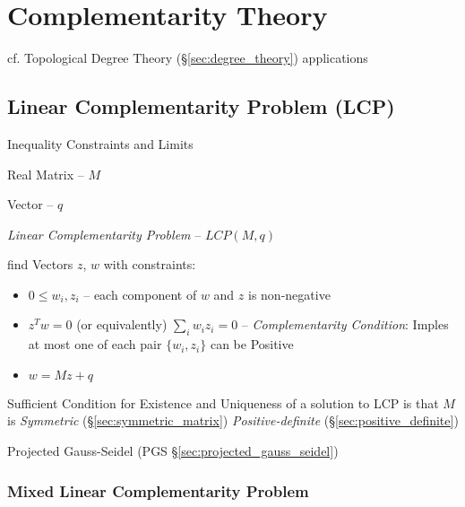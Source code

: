 \section{Complementarity Theory}\label{sec:complementarity_theory}

cf. Topological Degree Theory (\S\ref{sec:degree_theory}) applications



\subsection{Linear Complementarity Problem (LCP)}
\label{sec:linear_complementarity}


Inequality Constraints and Limits %

Real Matrix -- $M$

Vector -- $q$

\emph{Linear Complementarity Problem} -- $LCP(M,q)$

find Vectors $z$, $w$ with constraints:

\begin{itemize}
  \item $0 \leq w_i,z_i$ -- each component of $w$ and $z$ is
    non-negative
  \item $z^T w = 0$ (or equivalently) $\sum_i w_i z_i = 0$ --
    \emph{Complementarity Condition}: Imples at most one of each pair
    $\{w_i,z_i\}$ can be Positive
  \item $w = M z + q$
\end{itemize}

Sufficient Condition for Existence and Uniqueness of a solution to LCP
is that $M$ is \emph{Symmetric} (\S\ref{sec:symmetric_matrix})
\emph{Positive-definite} (\S\ref{sec:positive_definite})

\fist Projected Gauss-Seidel (PGS \S\ref{sec:projected_gauss_seidel})



\subsubsection{Mixed Linear Complementarity Problem}\label{sec:mlcp}

